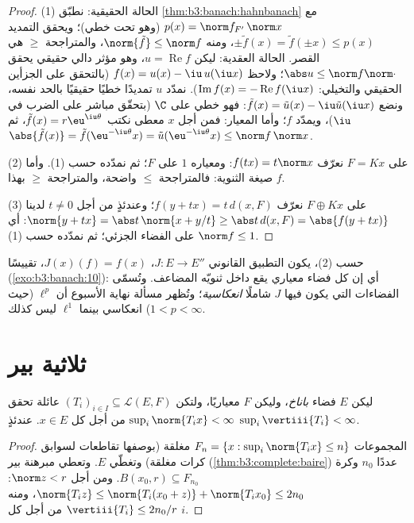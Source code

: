 \begin{proof}
(1) الحالة الحقيقية: نطبّق \cref{thm:b3:banach:hahnbanach} مع $p(x)
= \norm f_{F'}\,\norm x$ (وهو تحت خطي)؛
ويحقق التمديد $\pm\tilde f(x) = \tilde f(\pm x) \leq p(x)$، ومنه $\norm{\tilde f} \leq \norm f$، والمتراجحة $\geq$ هي القصر.
الحالة العقدية: ليكن $u = \operatorname{Re}f$، وهو مؤثر دالي حقيقي يحقق $\abs u \leq \norm f\norm\cdot$؛
ولاحظ $f(x) = u(x) -
\iu\,u(\iu x)$ (بالتحقق على الجزأين الحقيقي والتخيلي: $\operatorname{Im}f(x) = -\operatorname{Re}f(\iu x)$).
نمدّد $u$ تمديدًا خطيًا حقيقيًا بالحد نفسه، ونضع $\tilde f(x) =
\tilde u(x) - \iu\tilde u(\iu x)$: فهو خطي على
$\C$ (بتحقّق مباشر على الضرب في $\iu$)، ويمدّد $f$؛ وأما
المعيار: فمن أجل $x$ معطى نكتب $\tilde f(x) = r\eu^{\iu\theta}$، ثم $\abs{\tilde f(x)}
= \tilde f(\eu^{-\iu\theta}x) = \tilde u(\eu^{-\iu\theta}x)
\leq \norm f\,\norm x$.

(2) على $F = Kx$ نعرّف $f(tx) = t\norm x$: ومعياره $1$ على $F$؛ ثم نمدّده
حسب (1). وأما صيغة الثنوية: فالمتراجحة $\leq$ واضحة، والمتراجحة
$\geq$ بهذا $f$.

(3) على $F \oplus Kx$ نعرّف $f(y + tx) = t\,d(x, F)$؛ وعندئذٍ من أجل $t \neq 0$
لدينا $\norm{y + tx} = \abs t\,\norm{x + y/t} \geq \abs
t\,d(x, F) = \abs{f(y + tx)}$: أي $\norm f \leq 1$ على الفضاء الجزئي؛ ثم نمدّده
حسب (1).
\end{proof}

\begin{remark}\label{rem:b3:banach:bidual}
حسب (2)، يكون التطبيق القانوني $J \colon E \to E''$، $J(x)(f) =
f(x)$، تقييسًا
(\cref{exo:b3:banach:10}): أي إن كل فضاء معياري يقع داخل ثنويّه المضاعف.
وتُسمّى الفضاءات التي يكون فيها $J$ شاملًا
\emph{انعكاسية}؛ وتُظهر مسألة نهاية الأسبوع
أن $\ell^p$ (حيث $1 < p < \infty$) انعكاسي بينما $\ell^1$ ليس
كذلك.
\end{remark}

\section{ثلاثية بير}

\begin{theorem}
\label{thm:b3:banach:banachsteinhaus}
ليكن $E$ فضاء \emph{باناخ}، وليكن $F$ معياريًا، ولتكن $(T_i)_{i\in
I} \subseteq \mathcal L(E, F)$
عائلة تحقق $\sup_i
\norm{T_ix} < \infty$ من أجل كل $x \in E$. عندئذٍ
$\sup_i
\vertiii{T_i} < \infty$.
\end{theorem}

\begin{proof}
المجموعات $F_n = \{x : \sup_i\norm{T_ix} \leq n\}$ مغلقة (بوصفها تقاطعات لسوابق كرات مغلقة)
وتغطّي $E$. وتعطي مبرهنة بير (\cref{thm:b3:complete:baire}) عددًا $n_0$ وكرة
$B(x_0, r) \subseteq F_{n_0}$. ومن أجل $\norm z < r$: $\norm{T_iz}
\leq \norm{T_i(x_0 + z)} + \norm{T_ix_0} \leq 2n_0$، ومنه $\vertiii{T_i} \leq 2n_0/r$ من أجل كل
$i$.
\end{proof}

